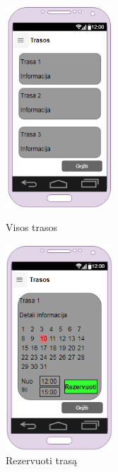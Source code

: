 \documentclass[oneside]{VUMIFPSkursinis}
\begin{document}
\begin{figure}[h]
\centering
\parbox{5cm}{
\includegraphics[width=4cm]{GUI-18-19-trasos.png}
\caption{Visos trasos}
\label{fig:2figsA}}
\qquad
\begin{minipage}{5cm}
\includegraphics[width=4cm]{GUI-18-19-detali-trasos-informacija.png}
\caption{Rezervuoti trasą}
\label{fig:2figsB}
\end{minipage}
\end{figure}
\end{document}
